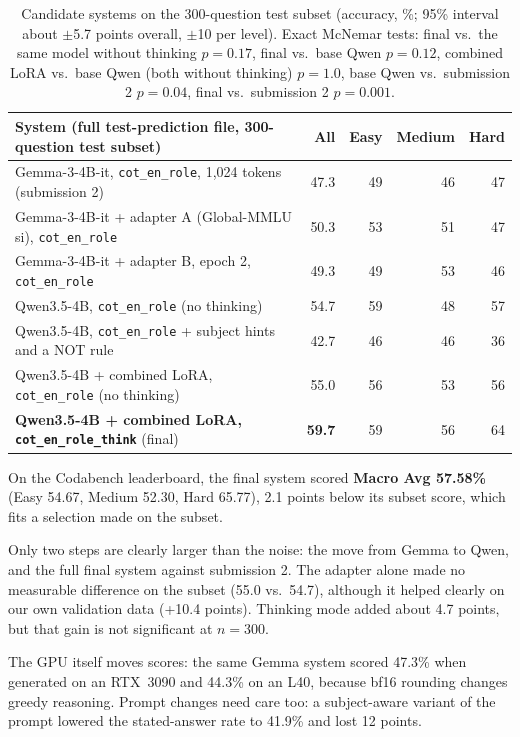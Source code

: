 \documentclass[10pt,a4paper]{article}
\newcommand{\best}[1]{\textbf{\textcolor{best}{#1}}}
\newcommand{\cond}[1]{\texttt{#1}}
\begin{document}
\begin{table}[h]
\centering\small
\begin{tabular}{lrrrr}
\toprule
System (full test-prediction file, 300-question test subset) & All & Easy & Medium & Hard\\
\midrule
Gemma-3-4B-it, \cond{cot\_en\_role}, 1,024 tokens (submission 2) & 47.3 & 49 & 46 & 47\\
Gemma-3-4B-it + adapter A (Global-MMLU si), \cond{cot\_en\_role} & 50.3 & 53 & 51 & 47\\
Gemma-3-4B-it + adapter B, epoch 2, \cond{cot\_en\_role} & 49.3 & 49 & 53 & 46\\
Qwen3.5-4B, \cond{cot\_en\_role} (no thinking) & 54.7 & 59 & 48 & 57\\
Qwen3.5-4B, \cond{cot\_en\_role} + subject hints and a NOT rule & 42.7 & 46 & 46 & 36\\
Qwen3.5-4B + combined LoRA, \cond{cot\_en\_role} (no thinking) & 55.0 & 56 & 53 & 56\\
\textbf{Qwen3.5-4B + combined LoRA, \cond{cot\_en\_role\_think}} (final) & \best{59.7} & 59 & 56 & 64\\
\bottomrule
\end{tabular}
\caption{Candidate systems on the 300-question test subset (accuracy, \%; 95\% interval about $\pm$5.7 points
overall, $\pm$10 per level). Exact McNemar tests: final vs.\ the same model without thinking $p = 0.17$, final vs.\
base Qwen $p = 0.12$, combined LoRA vs.\ base Qwen (both without thinking) $p = 1.0$, base Qwen vs.\ submission 2
$p = 0.04$, final vs.\ submission 2 $p = 0.001$.}
\end{table}
On the Codabench leaderboard, the final system scored \textbf{Macro Avg 57.58\%} (Easy 54.67, Medium 52.30, Hard
65.77), 2.1 points below its subset score, which fits a selection made on the subset.

Only two steps are clearly larger than the noise: the move from Gemma to Qwen, and the full final system against
submission 2. The adapter alone made no measurable difference on the subset (55.0 vs.\ 54.7), although it helped
clearly on our own validation data (+10.4 points). Thinking mode added about 4.7 points, but that gain is not
significant at $n = 300$.

The GPU itself moves scores: the same Gemma system scored 47.3\% when generated on an RTX~3090 and 44.3\% on an L40,
because bf16 rounding changes greedy reasoning. Prompt changes need care too: a subject-aware variant of the prompt
lowered the stated-answer rate to 41.9\% and lost 12 points.
\end{document}
